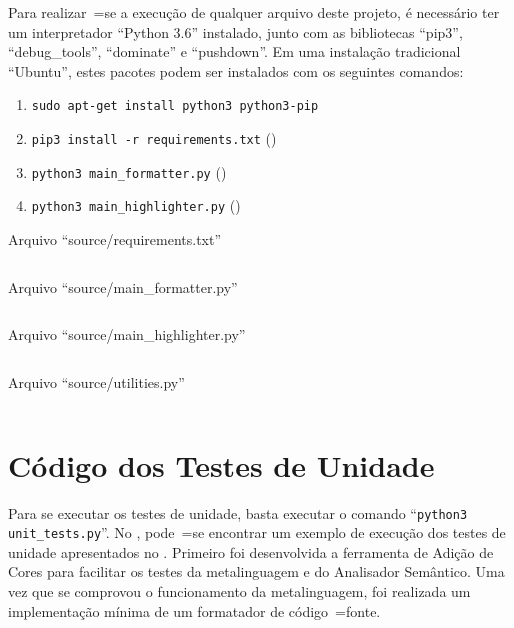 Para realizar~=se a execução de qualquer arquivo deste projeto,
é necessário ter um interpretador ``Python 3.6'' instalado,
junto com as bibliotecas ``pip3'',
``debug\_tools'', ``dominate'' e
``pushdown''.
Em uma instalação tradicional ``Ubuntu'',
estes pacotes podem ser instalados com os seguintes comandos:
\begin{enumerate}[1)]
\item \texttt{sudo apt-get install python3 python3-pip}
\item \texttt{pip3 install -r requirements.txt} ()
\item \texttt{python3 main_formatter.py} ()
\item \texttt{python3 main_highlighter.py} ()
\end{enumerate}
\begin{code}
\caption{Arquivo ``source/requirements.txt''}
\label{requirementsTxt}
\inputminted{python3}{../source/requirements.txt}
\end{code}
\begin{code}
\caption{Arquivo ``source/main\_formatter.py''}
\label{mainHighlighterPy}
\inputminted{python3}{../source/main_formatter.py}
\end{code}
\begin{code}
\caption{Arquivo ``source/main\_highlighter.py''}
\label{mainFormatterPy}
\inputminted{python3}{../source/main_formatter.py}
\end{code}
\begin{code}
\caption{Arquivo ``source/utilities.py''}
\label{utilitiesPy}
\inputminted{python3}{../source/utilities.py}
\end{code}


\chapter{Código dos Testes de Unidade}

Para se executar os testes de unidade,
basta executar o comando ``\texttt{python3 unit_tests.py}''.
No ,
pode~=se encontrar um exemplo de execução dos testes de unidade apresentados no .
Primeiro foi desenvolvida a ferramenta de Adição de Cores para facilitar os testes da metalinguagem e
do Analisador Semântico.
Uma vez que se comprovou o funcionamento da metalinguagem,
foi realizada um implementação mínima de um formatador de código~=fonte.

